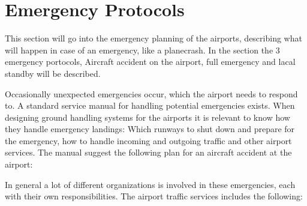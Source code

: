 \section{Emergency Protocols}

This section will go into the emergency planning of the airports, describing what will happen in case of an emergency, like a planecrash. In the section the 3 emergency portocols, Aircraft accident on the airport, full emergency and lacal standby will be described.

Occasionally unexpected emergencies occur, which the airport needs to respond to. A standard service manual for handling potential emergencies exists. When designing ground handling systems for the airports it is relevant to know how they handle emergency landings: Which runways to shut down and prepare for the emergency, how to handle incoming and outgoing traffic and other airport services.
The manual suggest the following plan for an aircraft accident at the airport:


In general a lot of different organizations is involved in these emergencies, each with their own responsibilities. The airport traffic services includes the following:

